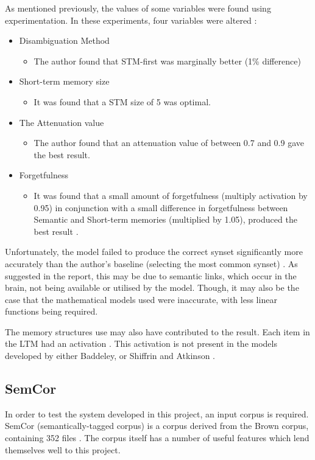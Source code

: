 \documentclass[]{article}
\begin{document}
As mentioned previously, the values of some variables were found using experimentation. In these experiments, four variables were altered \cite{MattBurkePrevious}:
\begin{itemize}
	\item Disambiguation Method
	\begin{itemize}
		\item[] The author found that STM-first was marginally better (1\% difference)
	\end{itemize}
	\item Short-term memory size
	\begin{itemize}
		\item[] It was found that a STM size of 5 was optimal.
	\end{itemize}
	\item The Attenuation value
	\begin{itemize}
		\item[] The author found that an attenuation value of between 0.7 and 0.9 gave the best result.
	\end{itemize}
	\item Forgetfulness
	\begin{itemize}
		\item[] It was found that a small amount of forgetfulness (multiply activation by 0.95) in conjunction with a small difference in forgetfulness between Semantic and Short-term memories (multiplied by 1.05), produced the best result \cite{MattBurkePrevious}.
	\end{itemize}
\end{itemize}

Unfortunately, the model failed to produce the correct synset significantly more accurately than the author's baseline (selecting the most common synset) \cite{MattBurkePrevious}. As suggested in the report, this may be due to semantic links, which occur in the brain, not being available or utilised by the model. Though, it may also be the case that the mathematical models used were inaccurate, with less linear functions being required.

The memory structures use may also have contributed to the result. Each item in the LTM had an activation \cite{MattBurkePrevious}. This activation is not present in the models developed by either Baddeley, or Shiffrin and Atkinson \cite{MemoryBaddeleyEysenkAnderson, ControlProcessesSTMAtkinson}.

\subsection{SemCor}
\label{sec:SEMCOR}
In order to test the system developed in this project, an input corpus is required. SemCor (semantically-tagged corpus) is a corpus derived from the Brown corpus, containing 352 files \cite{SEMCOR}. The corpus itself has a number of useful features which lend themselves well to this project.
\end{document}
